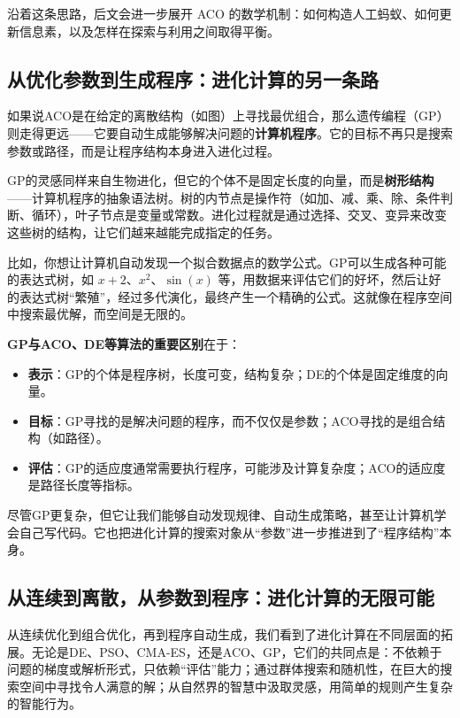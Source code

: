 \documentclass[lang=cn,zihao=-4,a4paper,fontset=windows]{beautybook}
\begin{document}
沿着这条思路，后文会进一步展开 ACO 的数学机制：如何构造人工蚂蚁、如何更新信息素，以及怎样在探索与利用之间取得平衡。

\subsection{从优化参数到生成程序：进化计算的另一条路}

如果说ACO是在给定的离散结构（如图）上寻找最优组合，那么遗传编程（GP）则走得更远——它要自动生成能够解决问题的\textbf{计算机程序}。它的目标不再只是搜索参数或路径，而是让程序结构本身进入进化过程。

GP的灵感同样来自生物进化，但它的个体不是固定长度的向量，而是\textbf{树形结构}——计算机程序的抽象语法树。树的内节点是操作符（如加、减、乘、除、条件判断、循环），叶子节点是变量或常数。进化过程就是通过选择、交叉、变异来改变这些树的结构，让它们越来越能完成指定的任务。

比如，你想让计算机自动发现一个拟合数据点的数学公式。GP可以生成各种可能的表达式树，如 $x+2$、$x^2$、$\sin(x)$ 等，用数据来评估它们的好坏，然后让好的表达式树“繁殖”，经过多代演化，最终产生一个精确的公式。这就像在程序空间中搜索最优解，而空间是无限的。

\textbf{GP与ACO、DE等算法的重要区别}在于：
\begin{itemize}
    \item \textbf{表示}：GP的个体是程序树，长度可变，结构复杂；DE的个体是固定维度的向量。
    \item \textbf{目标}：GP寻找的是解决问题的程序，而不仅仅是参数；ACO寻找的是组合结构（如路径）。
    \item \textbf{评估}：GP的适应度通常需要执行程序，可能涉及计算复杂度；ACO的适应度是路径长度等指标。
\end{itemize}

尽管GP更复杂，但它让我们能够自动发现规律、自动生成策略，甚至让计算机学会自己写代码。它也把进化计算的搜索对象从“参数”进一步推进到了“程序结构”本身。

\subsection{从连续到离散，从参数到程序：进化计算的无限可能}

从连续优化到组合优化，再到程序自动生成，我们看到了进化计算在不同层面的拓展。无论是DE、PSO、CMA-ES，还是ACO、GP，它们的共同点是：不依赖于问题的梯度或解析形式，只依赖“评估”能力；通过群体搜索和随机性，在巨大的搜索空间中寻找令人满意的解；从自然界的智慧中汲取灵感，用简单的规则产生复杂的智能行为。
\end{document}
